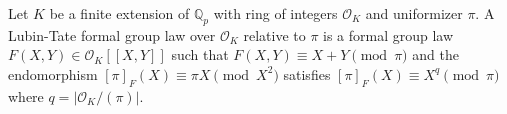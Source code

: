 Let $K$ be a finite extension of $\mathbb{Q}_p$ with ring of integers $\mathcal{O}_K$ and uniformizer $\pi$. A Lubin-Tate formal group law over $\mathcal{O}_K$ relative to $\pi$ is a formal group law $F(X,Y) \in \mathcal{O}_K[[X,Y]]$ such that $F(X,Y) \equiv X+Y \pmod{\pi}$ and the endomorphism $[\pi]_F(X) \equiv \pi X \pmod{X^2}$ satisfies $[\pi]_F(X) \equiv X^q \pmod{\pi}$ where $q = |\mathcal{O}_K/(\pi)|$.
